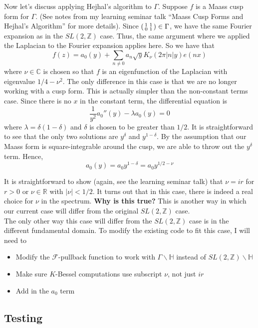 \documentclass[]{article}
\begin{document}
Now let's discuss applying Hejhal's algorithm to $\Gamma$.
Suppose $f$ is a Maass cusp form for $\Gamma$.
(See notes from my learning seminar talk ``Maass Cusp Forms and Hejhal's Algorithm'' for more details).
Since
$
\begin{psmallmatrix}
1 & 1 \\
0 & 1
\end{psmallmatrix} \in \Gamma
$,
we have the same Fourier expansion as in the $SL(2, \mathbb{Z})$ case.
Thus, the same argument where we applied the Laplacian to the Fourier expansion applies here.
So we have that
$$
f(z) = a_0(y) + \sum_{n\neq0} a_n\sqrt{y}K_{\nu}(2\pi|n|y)e(nx)
$$
where $\nu \in \mathbb{C}$ is chosen so that $f$ is an eigenfunction of the Laplacian with eigenvalue $1/4 - \nu^2$.
The only difference in this case is that we are no longer working with a cusp form.
This is actually simpler than the non-constant terms case.
Since there is no $x$ in the constant term, the differential equation is
$$
\frac{1}{y^2}a_0''(y) - \lambda a_0(y) = 0
$$
where $\lambda = \delta(1 - \delta)$ and $\delta$ is chosen to be greater than $1/2$.
It is straightforward to see that the only two solutions are $y^\delta$ and $y^{1-\delta}$.
By the assumption that our Maass form is square-integrable around the cusp, we are able to throw out the $y^\delta$ term.
Hence,
$$
a_0(y) = a_0y^{1-\delta} = a_0y^{1/2 - \nu}
$$

It is straightforward to show (again, see the learning seminar talk) that $\nu = ir$ for $r > 0$ or $\nu \in \mathbb{R}$ with $|\nu| < 1/2$.
It turns out that in this case, there is indeed a real choice for $\nu$ in the spectrum.
\textbf{Why is this true?}
This is another way in which our current case will differ from the original $SL(2, \mathbb{Z})$ case.
\\

The only other way this case will differ from the $SL(2, \mathbb{Z})$ case is in the different fundamental domain.
To modify the existing code to fit this case, I will need to
\begin{itemize}
	\item Modify the $\mathcal{F}$-pullback function to work with $\Gamma\backslash\mathbb{H}$ instead of $SL(2, \mathbb{Z})\backslash\mathbb{H}$
	\item Make sure $K$-Bessel computations use subscript $\nu$, not just $ir$
	\item Add in the $a_0$ term
\end{itemize}

\subsection{Testing}
\end{document}
